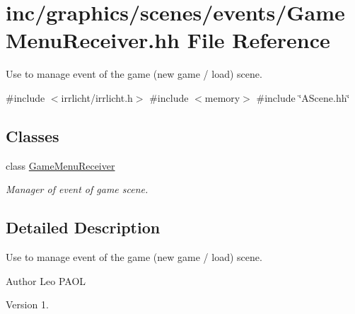 \hypertarget{GameMenuReceiver_8hh}{}\section{inc/graphics/scenes/events/\+Game\+Menu\+Receiver.hh File Reference}
\label{GameMenuReceiver_8hh}


Use to manage event of the game (new game / load) scene.  


{\ttfamily \#include $<$irrlicht/irrlicht.\+h$>$}\newline
{\ttfamily \#include $<$memory$>$}\newline
{\ttfamily \#include \char`\"{}A\+Scene.\+hh\char`\"{}}\newline
\subsection*{Classes}
\begin{DoxyCompactItemize}
\item 
class \hyperlink{classGameMenuReceiver}{Game\+Menu\+Receiver}
\begin{DoxyCompactList}\small\item\em Manager of event of game scene. \end{DoxyCompactList}\end{DoxyCompactItemize}


\subsection{Detailed Description}
Use to manage event of the game (new game / load) scene. 

\begin{DoxyAuthor}{Author}
Leo P\+A\+OL 
\end{DoxyAuthor}
\begin{DoxyVersion}{Version}
1. 
\end{DoxyVersion}
